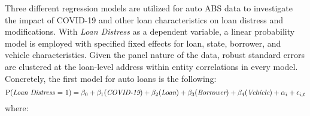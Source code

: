 \documentclass[10.5pt]{article}
\begin{document}
Three different regression models are utilized for auto ABS data to investigate the impact of COVID-19 and other loan characteristics on loan distress and modifications. With \textit{Loan Distress} as a dependent variable, a linear probability model is employed with specified fixed effects for loan, state, borrower, and vehicle characteristics. Given the panel nature of the data, robust standard errors are clustered at the loan-level address within entity correlations in every model. Concretely, the first model for auto loans is the following:  
\begin{equation}
    \text{P(\textit{Loan Distress} = 1)} = \beta_0 +
    \beta_1(\textit{COVID-19}) +
    \beta_2(\textit{Loan}) + \beta_3(\textit{Borrower}) + 
    \beta_4(\textit{Vehicle}) + \alpha_i + \epsilon_{i,t}
\end{equation}
where: 
\end{document}
